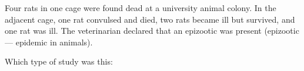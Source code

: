 
Four rats in one cage were found dead at a university animal colony.
In the adjacent cage, one rat convulsed and died, two rats became ill
but survived, and one rat was ill.  The veterinarian declared that an
epizootic was present (epizootic --- epidemic in animals).

Which type of study was this:
\begin{MultipleChoice}
\end{MultipleChoice}


